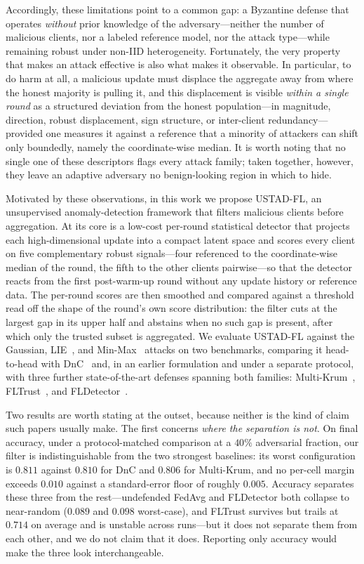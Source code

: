 \documentclass[journal]{IEEEtran}
\begin{document}
Accordingly, these limitations point to a common gap: a Byzantine defense that operates \emph{without} prior knowledge of the adversary---neither the number of malicious clients, nor a labeled reference model, nor the attack type---while remaining robust under non-IID heterogeneity. Fortunately, the very property that makes an attack effective is also what makes it observable. In particular, to do harm at all, a malicious update must displace the aggregate away from where the honest majority is pulling it, and this displacement is visible \emph{within a single round} as a structured deviation from the honest population---in magnitude, direction, robust displacement, sign structure, or inter-client redundancy---provided one measures it against a reference that a minority of attackers can shift only boundedly, namely the coordinate-wise median. It is worth noting that no single one of these descriptors flags every attack family; taken together, however, they leave an adaptive adversary no benign-looking region in which to hide.

Motivated by these observations, in this work we propose USTAD-FL, an unsupervised anomaly-detection framework that filters malicious clients before aggregation. At its core is a low-cost per-round statistical detector that projects each high-dimensional update into a compact latent space and scores every client on five complementary robust signals---four referenced to the coordinate-wise median of the round, the fifth to the other clients pairwise---so that the detector reacts from the first post-warm-up round without any update history or reference data. The per-round scores are then smoothed and compared against a threshold read off the shape of the round's own score distribution: the filter cuts at the largest gap in its upper half and abstains when no such gap is present, after which only the trusted subset is aggregated. We evaluate USTAD-FL against the Gaussian, LIE~\cite{baruch2019little}, and Min-Max~\cite{shejwalkar2021manipulating} attacks on two benchmarks, comparing it head-to-head with DnC~\cite{shejwalkar2021manipulating} and, in an earlier formulation and under a separate protocol, with three further state-of-the-art defenses spanning both families: Multi-Krum~\cite{blanchard2017machine}, FLTrust~\cite{cao2020fltrust}, and FLDetector~\cite{zhang2022fldetector}.

Two results are worth stating at the outset, because neither is the kind of claim such papers usually make. The first concerns \emph{where the separation is not}. On final accuracy, under a protocol-matched comparison at a $40\%$ adversarial fraction, our filter is indistinguishable from the two strongest baselines: its worst configuration is $0.811$ against $0.810$ for DnC and $0.806$ for Multi-Krum, and no per-cell margin exceeds $0.010$ against a standard-error floor of roughly $0.005$. Accuracy separates these three from the rest---undefended FedAvg and FLDetector both collapse to near-random ($0.089$ and $0.098$ worst-case), and FLTrust survives but trails at $0.714$ on average and is unstable across runs---but it does not separate them from each other, and we do not claim that it does. Reporting only accuracy would make the three look interchangeable.
\end{document}

